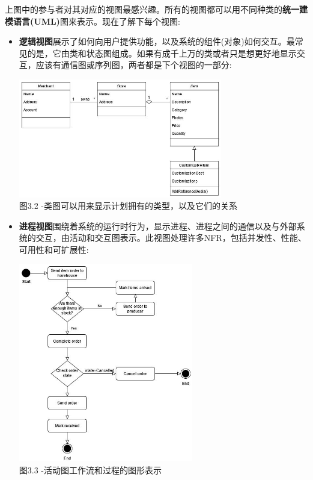 上图中的参与者对其对应的视图最感兴趣。所有的视图都可以用不同种类的\textbf{统一建模语言(UML)}图来表示。现在了解下每个视图:

\begin{itemize}
\item 
\textbf{逻辑视图}展示了如何向用户提供功能，以及系统的组件(对象)如何交互。最常见的是，它由类和状态图组成。如果有成千上万的类或者只是想更好地显示交互，应该有通信图或序列图，两者都是下个视图的一部分:

\begin{center}
\includegraphics[width=0.7\textwidth]{content/1/chapter3/images/2.jpg}\\
图3.2 -类图可以用来显示计划拥有的类型，以及它们的关系
\end{center}

\item 
\textbf{进程视图}围绕着系统的运行时行为，显示进程、进程之间的通信以及与外部系统的交互，由活动和交互图表示。此视图处理许多NFR，包括并发性、性能、可用性和可扩展性:

\begin{center}
\includegraphics[width=0.6\textwidth]{content/1/chapter3/images/3.jpg}\\
图3.3 -活动图工作流和过程的图形表示
\end{center}


\end{itemize}

